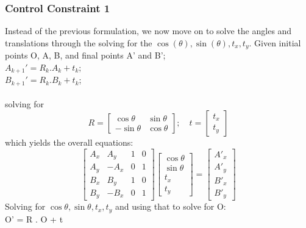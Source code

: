 \documentclass[12pt,english]{report}
\begin{document}
\subsubsection*{Control Constraint 1}
Instead of the previous formulation, we  now move on to solve the angles and translations through the solving for the $\cos(\theta), \sin(\theta), t_x, t_y$. Given initial points O, A, B, and final points A' and B';\\ 
$A_{k+1}' = R_k . A_k + t_k;$\\
$B_{k+1}' = R_k . B_k + t_k$;\\
\\solving for
\[
R = \begin{bmatrix}
        \cos \theta & \sin \theta\\
        -\sin \theta & \cos \theta
    \end{bmatrix}; \quad t = \begin{bmatrix}
        t_x \\
        t_y
    \end{bmatrix}
\]
which yields the overall equations:
\begin{equation}
    \begin{bmatrix}
        A_x & A_y & 1 & 0 \\
        A_y & -A_x & 0 & 1 \\
        B_x & B_y & 1 & 0 \\
        B_y & -B_x & 0 & 1
    \end{bmatrix}
    \begin{bmatrix}
        \cos \theta \\ \sin \theta \\ t_x \\ t_y
    \end{bmatrix}
    =
    \begin{bmatrix}
        A'_x \\[4pt] A'_y \\[4pt] B'_x \\[4pt] B'_y
    \end{bmatrix}
\end{equation}
Solving for $\cos\theta, \sin\theta, t_x, t_y$ and using that to solve for O:\\
O' = R . O + t
\end{document}
